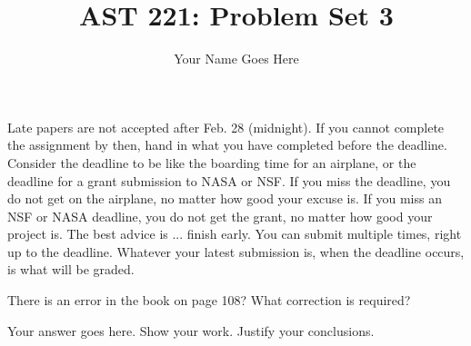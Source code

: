 \documentclass[12pt]{article}
\newenvironment{problem}[2][Problem]{\begin{trivlist}
\item[\hskip \labelsep {\bfseries #1}\hskip \labelsep {\bfseries #2.}]}{\end{trivlist}}
\newenvironment{answer}[2][Answer]{\begin{trivlist}
\item[\hskip \labelsep {\bfseries #1}\hskip \labelsep {\bfseries #2.}]}{\end{trivlist}}
\begin{document}
 
 
\title{AST 221: Problem Set 3}
\author{Your Name Goes Here}
\maketitle

 Late papers are not accepted after Feb. 28 (midnight). If you cannot complete the assignment by then, hand in what you have completed before the deadline. Consider the deadline to be like the boarding time for an airplane, or the deadline for a grant submission to NASA or NSF. If you miss the deadline, you do not get on the airplane, no matter how good your excuse is. If you miss an NSF or NASA deadline, you do not get the grant, no matter how good your project is. The best advice is ... finish early. You can submit multiple times, right up to the deadline. Whatever your latest submission is, when the deadline occurs, is what will be graded.
 
\begin{problem}{1} There is an error in the book on page 108? What correction is required?

\end{problem}

\begin{answer}{1}
Your answer goes here. Show your work. Justify your conclusions.
\end{answer}
\end{document}
